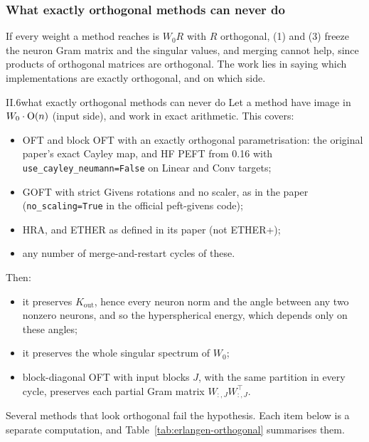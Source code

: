 \subsubsection{What exactly orthogonal methods can never do}\label{sec:erlangen-orthogonal}

If every weight a method reaches is $W_0R$ with $R$ orthogonal, (1) and (3) freeze the neuron Gram
matrix and the singular values, and merging cannot help, since products of orthogonal matrices are orthogonal. The work
lies in saying which implementations are exactly orthogonal, and on which side.

\begin{corollary}{II.6}{what exactly orthogonal methods can never do}
Let a method have image in $W_0\cdot\mathrm{O}(n)$ (input side), and work in exact arithmetic. This covers:
\begin{itemize}
  \item OFT and block OFT with an exactly orthogonal parametrisation: the original paper's exact Cayley map, and HF PEFT
    from 0.16 with \texttt{use\_cayley\_\allowbreak neumann=False} on Linear and Conv targets;
  \item GOFT with strict Givens rotations and no scaler, as in the paper (\texttt{no\_scaling=True} in the official
    peft-givens code);
  \item HRA, and ETHER as defined in its paper (not ETHER+);
  \item any number of merge-and-restart cycles of these.
\end{itemize}
Then:
\begin{itemize}
  \item it preserves $K_{\mathrm{out}}$, hence every neuron norm and the angle between any two nonzero neurons, and so the
    hyperspherical energy, which depends only on these angles;
  \item it preserves the whole singular spectrum of $W_0$;
  \item block-diagonal OFT with input blocks $J$, with the same partition in every cycle, preserves each partial Gram
    matrix $W_{:,J}W_{:,J}^{\top}$.
\end{itemize}
\end{corollary}

Several methods that look orthogonal fail the hypothesis. Each item below is a separate computation, and
Table~\ref{tab:erlangen-orthogonal} summarises them.

